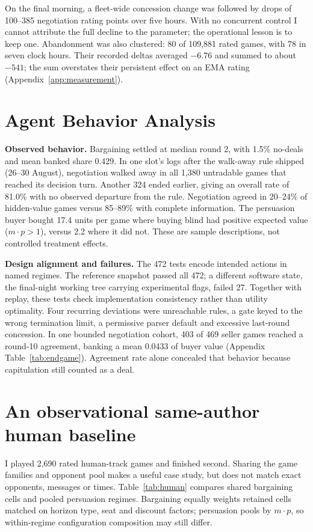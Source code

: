 \documentclass{article}
\begin{document}
On the final morning, a fleet-wide concession change was followed by drops of
100--385 negotiation rating points over five hours. With no concurrent control
I cannot attribute the full decline to the parameter; the operational lesson is
to keep one. Abandonment was also clustered:
80 of 109,881 rated games, with 78 in seven clock hours. Their recorded deltas
averaged $-6.76$ and summed to about $-541$; the sum overstates their persistent
effect on an EMA rating (Appendix~\ref{app:measurement}).

\section{Agent Behavior Analysis}
\textbf{Observed behavior.} Bargaining settled at median round 2, with 1.5\%
no-deals and mean banked share 0.429. In one slot's logs after the walk-away rule
shipped (26--30 August), negotiation walked away in all 1,380 untradable games
that reached its decision turn. Another 324 ended earlier, giving an overall rate
of 81.0\% with no observed departure from the rule. Negotiation agreed in 20--24\% of hidden-value games versus 85--89\%
with complete information. The persuasion buyer bought 17.4 units per game
where buying blind had positive expected value ($m\cdot p>1$), versus 2.2 where it
did not.
These are sample descriptions, not controlled treatment effects.

\textbf{Design alignment and failures.} The 472 tests encode intended actions
in named regimes. The reference snapshot passed all 472; a different software
state, the final-night working tree carrying experimental flags, failed 27. Together with replay, these tests
check implementation consistency rather than utility optimality. Four recurring
deviations were unreachable rules, a gate keyed to the wrong termination limit,
a permissive parser default and excessive last-round concession. In one bounded
negotiation cohort, 403 of 469 seller games reached a round-10 agreement, banking a
mean 0.0433 of buyer value (Appendix Table~\ref{tab:endgame}). Agreement rate alone concealed that
behavior because capitulation still counted as a deal.

\section{An observational same-author human baseline}
I played 2,690 rated human-track games and finished second. Sharing the game
families and opponent pool makes a useful case study, but does not match exact
opponents, messages or times. Table~\ref{tab:human} compares shared bargaining
cells and pooled persuasion regimes. Bargaining equally weights retained cells
matched on horizon type, seat and discount factors; persuasion pools by $m\cdot p$,
so within-regime configuration composition may still differ.
\end{document}
